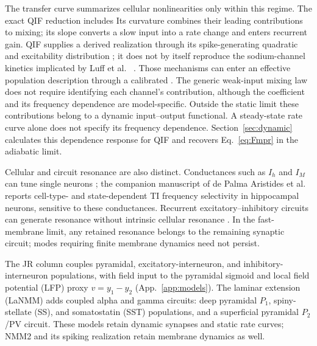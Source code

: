 \documentclass[11pt,a4paper]{article}
\providecommand{\DIFaddtex}[1]{{\protect\color{blue} \sf #1}} %
\providecommand{\DIFdeltex}[1]{{\protect\color{red} \scriptsize #1}} %
\providecommand{\DIFaddbegin}{} %
\providecommand{\DIFaddend}{} %
\providecommand{\DIFdelbegin}{} %
\providecommand{\DIFdelend}{} %
\providecommand{\DIFadd}[1]{\texorpdfstring{\DIFaddtex{#1}}{#1}} %
\providecommand{\DIFdel}[1]{\texorpdfstring{\DIFdeltex{#1}}{}} %
\begin{document}
The transfer curve summarizes cellular nonlinearities \DIFdelbegin \DIFdel{only }\DIFdelend within this regime. \DIFdelbegin \DIFdel{The exact QIF reduction includes }\DIFdelend \DIFaddbegin \DIFadd{Its
curvature combines their leading contributions to mixing; its slope converts a
slow input into a rate change and enters recurrent gain. QIF supplies a derived
realization through }\DIFaddend its spike-generating quadratic and excitability distribution\DIFdelbegin \DIFdel{; it does not by itself reproduce the sodium-channel kinetics implicated
by Luff et al. \ \cite{luff2024mixer}. Those mechanisms can enter an effective
population description through a calibrated }\DIFdelend \DIFaddbegin \DIFadd{.
The generic weak-input mixing law does not require identifying each channel's
contribution, although the coefficient and its frequency dependence are
model-specific. Outside the static limit these contributions belong to a }\DIFaddend dynamic
input--output functional. \DIFdelbegin \DIFdel{A steady-state rate curve alone does not specify its frequency dependence.
}\DIFdelend Section~\ref{sec:dynamic} calculates this \DIFdelbegin \DIFdel{dependence }\DIFdelend \DIFaddbegin \DIFadd{response }\DIFaddend for
QIF and recovers Eq.~\eqref{eq:Fmpr} in the adiabatic limit.

Cellular and circuit resonance are also distinct. Conductances such as $I_h$ and
$I_M$ can tune single neurons \cite{hutcheonyarom2000}; the companion manuscript of
de Palma Aristides et al.\ \cite{depalma2026ti} reports cell-type- and state-dependent
TI frequency selectivity in hippocampal neurons, sensitive to these conductances.
Recurrent excitatory--inhibitory circuits can generate resonance without intrinsic
cellular resonance \cite{brunelhakim1999,brunelwang2003}. In the fast-membrane limit,
any retained resonance belongs to the remaining synaptic circuit; modes requiring
finite membrane dynamics need not persist.

The JR column couples pyramidal, excitatory-interneuron, and inhibitory-interneuron
populations, with field input to the pyramidal sigmoid and local field potential
(LFP) proxy $v=y_1-y_2$ (App.~\ref{app:models}). The laminar extension (LaNMM)
\cite{ruffini2025cfc,sanchezTodo2023} adds coupled alpha and gamma circuits: deep
pyramidal $P_1$, spiny-stellate (SS), and somatostatin (SST) populations, and a
superficial pyramidal $P_2$/PV circuit. These models retain dynamic synapses and
static rate curves; NMM2 and its spiking realization retain membrane dynamics as well.
\end{document}
